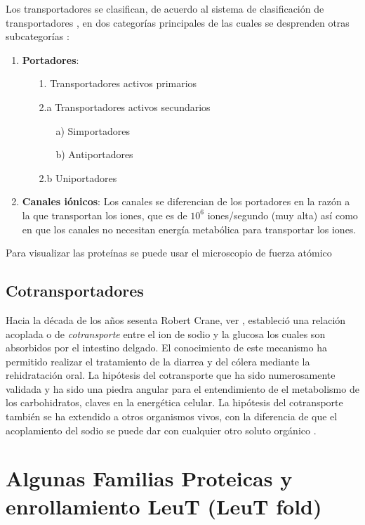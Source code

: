 Los transportadores se clasifican, de acuerdo al sistema de clasificaci\'{o}n de transportadores \cite{Nelson2011}, en dos categor\'{i}as principales de las cuales se desprenden otras subcategor\'{i}as :
\begin{enumerate}
 \item \textbf{Portadores}:
 \begin{enumerate}
 \item[1.] Transportadores activos primarios
 \item[2.a] Transportadores activos secundarios
  \begin{enumerate}
 \item[a)] Simportadores
 \item[b)] Antiportadores
 \end{enumerate}
 \item[2.b] Uniportadores
 \end{enumerate}
 \item  \textbf{Canales i\'{o}nicos}: Los canales se diferencian de los portadores en la raz\'{o}n a la que transportan los iones, que es de $10^6$ iones/segundo  (muy alta) as\'{i} como en que los canales no necesitan energ\'{i}a metab\'{o}lica para transportar los iones.
\end{enumerate}


Para visualizar las prote\'{i}nas se puede usar el microscopio de fuerza at\'{o}mico
\subsection{Cotransportadores}
Hacia la d\'{e}cada de los a\~{n}os sesenta Robert Crane, ver \cite{Hamilton2013}, estableci\'{o} una relaci\'{o}n acoplada o de \textit{cotransporte} entre el ion de sodio y la glucosa los cuales son absorbidos por el intestino delgado. El conocimiento de este mecanismo ha permitido realizar el tratamiento de la diarrea y del c\'{o}lera mediante la rehidrataci\'{o}n oral. La hip\'{o}tesis del cotransporte que ha sido numerosamente validada y ha sido una piedra angular para el entendimiento de el metabolismo de los carbohidratos, claves en la energ\'{e}tica celular. La hip\'{o}tesis del cotransporte tambi\'{e}n se ha extendido a otros organismos vivos, con la diferencia de que el acoplamiento del sodio se puede dar con cualquier otro soluto org\'{a}nico \cite{Faham2008}.\\
\section{Algunas Familias Proteicas y enrollamiento LeuT (LeuT fold)}
